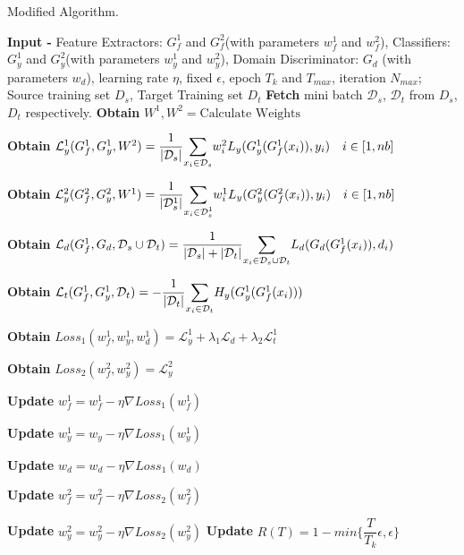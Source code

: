 \begin{algorithm}[H]
	\caption{Modified Algorithm.} 
	\begin{algorithmic}[1]
	    \State \textbf{Input -} Feature Extractors: $G_{f}^1$ and $G_{f}^2$(with parameters $w_{f}^1$ and $w_{f}^2$), Classifiers: $G_{y}^1$ and $G_{y}^2$(with parameters $w_{y}^1$ and $w_{y}^2$), Domain Discriminator: $G_d$ (with parameters $w_d$), learning rate $\eta$, fixed $\epsilon$, epoch $T_k$ and $T_{max}$, iteration $N_{max}$;
		    \State Source training set ${D_s}$, Target Training set ${D_t}$
				    \State \textbf{Fetch} mini batch $\mathcal{D}_s$, $\mathcal{D}_t$ from ${D_s}$, ${D_t}$ respectively.
				    \State \textbf{Obtain} $W^1, W^2 = \text{Calculate Weights}$ 
				    
				    \State \textbf{Obtain} $\mathcal{L}_{y}^1(G_{f}^1, G_{y}^1,W^2) =\dfrac{1}{|\mathcal{D}_{s}|} \mathlarger\sum\limits_{x_i \in \mathcal{D}_{s}} w_{i}^2 L_y(G_{y}^1(G_{f}^1(x_i)),y_i) \quad i \in [1, nb]$
				    
                    \State \textbf{Obtain} $\mathcal{L}_{y}^2(G_{f}^2, G_{y}^2, W^1) =\dfrac{1}{|\mathcal{D}_{s}^1|} \mathlarger\sum\limits_{x_i \in \mathcal{D}_{s}^1} w_{i}^1 L_y(G_{y}^2(G_{f}^2(x_i)),y_i) \quad i \in [1, nb]$
				    
				    \State \textbf{Obtain} $\mathcal{L}_d(G_{f}^1, G_{d}, \mathcal{D}_s \cup \mathcal{D}_t) = \dfrac{1}{|\mathcal{D}_s| + |\mathcal{D}_t|} \mathlarger\sum\limits_{x_i \in \mathcal{D}_s \cup \mathcal{D}_t} L_d(G_d(G_{f}^1(x_i)), d_i)$
				    
				    \State \textbf{Obtain} $\mathcal{L}_t(G_{f}^1, G_{y}^1, \mathcal{D}_t) = - \dfrac{1}{|\mathcal{D}_t|} \mathlarger\sum\limits_{x_i \in \mathcal{D}_t} H_y(G_{y}^1(G_{f}^1(x_i)))$ 
				    
				    \State \textbf{Obtain} $Loss_1(w_{f}^1, w_{y}^1, w_{d}^1) = \mathcal{L}_{y}^1 + \lambda_1 \mathcal{L}_{d} + \lambda_2\mathcal{L}_{t}^1$
				    
				    \State \textbf{Obtain} $Loss_2(w_{f}^2, w_{y}^2) = \mathcal{L}_{y}^2$
				    
				    \State \textbf{Update} $w_{f}^1 = w_{f}^1 - \eta\nabla Loss_1(w_{f}^1)$
				    
				    \State \textbf{Update} $w_{y}^1 = w_{y} - \eta\nabla Loss_1(w_{y}^1)$
				    
				    \State \textbf{Update} $w_{d} = w_{d} - \eta\nabla Loss_1(w_{d})$
				    
				    \State \textbf{Update} $w_{f}^2 = w_{f}^2 - \eta\nabla Loss_2(w_{f}^2)$
				    
				    \State \textbf{Update} $w_{y}^2 = w_{y}^2 - \eta\nabla Loss_2(w_{y}^2)$
			    \EndFor
			 \State \textbf{Update} $R(T)= 1- min\bigg\{\dfrac{T}{T_k}\epsilon, \epsilon\bigg\}$
	\EndFor
	\end{algorithmic} 
\end{algorithm}
